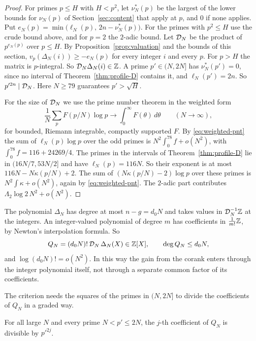 \begin{proof}
For primes $p\le H$ with $H<p^2$, let $\nu^*_N(p)$ be the largest of the lower bounds for $\nu_N(p)$ of
Section~\ref{sec:content} that apply at $p$, and $0$ if none applies. Put
$e_N(p)=\min\bigl(\ell_N(p),\,2n-\nu^*_N(p)\bigr)$. For the primes with $p^2\le H$ use the crude bound
above, and for $p=2$ the $2$-adic bound. Let $\mathcal D_N$ be the product of $p^{e_N(p)}$ over $p\le H$. By
Proposition~\ref{prop:valuation} and the bounds of this section, $v_p(\Delta_N(i))\ge-e_N(p)$ for every
integer $i$ and every $p$. For $p>H$ the matrix is $p$-integral. So $\mathcal D_N\Delta_N(i)\in\mathbb Z$. A prime
$p'\in(N,2N]$ has $\nu^*_N(p')=0$, since no interval of Theorem~\ref{thm:profile-D} contains it, and
$\ell_N(p')=2n$. So $p'^{2n}\mid\mathcal D_N$. Here $N\ge79$ guarantees $p'>\sqrt H$.

For the size of $\mathcal D_N$ we use the prime number theorem in the weighted form
\begin{equation}\label{eq:weighted-pnt}
 \frac1N\sum_{p}F(p/N)\log p\longrightarrow\int_0^\infty F(\theta)\,d\theta\qquad(N\to\infty),
\end{equation}
for bounded, Riemann integrable, compactly supported $F$. By \eqref{eq:weighted-pnt} the sum of
$\ell_N(p)\log p$ over the odd primes is $N^2\int_0^{78}f+o(N^2)$, with $\int_0^{78}f=116+24269/4$. The primes in
the intervals of Theorem~\ref{thm:profile-D} lie in $(16N/7,53N/2]$ and have $\ell_N(p)=116N$. So their
exponent is at most $116N-N\kappa(p/N)+2$. The sum of $(N\kappa(p/N)-2)\log p$ over these primes is
$N^2\int\kappa+o(N^2)$, again by \eqref{eq:weighted-pnt}. The $2$-adic part contributes
$\Lambda_2\log2\,N^2+o(N^2)$.
\end{proof}

The polynomial $\Delta_N$ has degree at most $n-g=d_0N$ and takes values in $\mathcal D_N^{-1}\mathbb Z$ at the integers.
An integer-valued polynomial of degree $m$ has coefficients in $\frac1{m!}\mathbb Z$, by Newton's interpolation
formula. So
\begin{equation}\label{eq:QN}
 Q_N=(d_0N)!\,\mathcal D_N\,\Delta_N(X)\in\mathbb Z[X],\qquad \deg Q_N\le d_0N,
\end{equation}
and $\log(d_0N)!=o(N^2)$. In this way the gain from the corank enters through the integer polynomial
itself, not through a separate common factor of its coefficients.

The criterion needs the squares of the primes in $(N,2N]$ to divide the coefficients of $Q_N$ in a graded
way.

\begin{lemma}\label{lem:squares}
For all large $N$ and every prime $N<p'\le2N$, the $j$-th coefficient of $Q_N$ is divisible by $p'^{2j}$.
\end{lemma}

